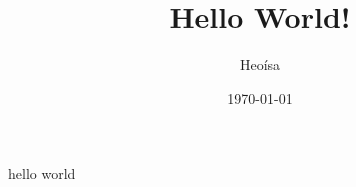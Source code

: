 \documentclass[twocolumn]{article}
\title{Hello World!}
\author{Heoísa}
\date{\today}
\begin{document}
    \maketitle
    \begin{center}
        hello world
    \end{center}
\end{document}
